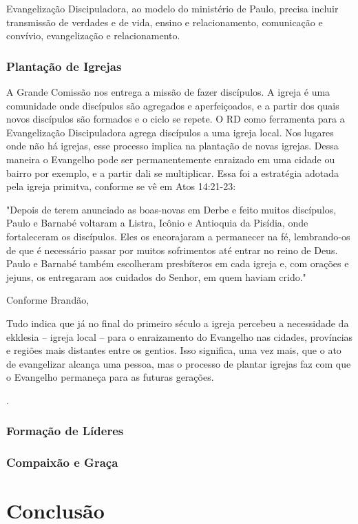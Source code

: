 \documentclass[
	12pt,				%
	openright,			%
	twoside,			%
	a4paper,			%
	english,			%
	french,				%
	spanish,			%
	brazil				%
	]{abntex2}
\begin{document}
Evangelização Discipuladora, ao modelo do ministério de Paulo, precisa incluir transmissão de verdades e de vida, ensino e relacionamento, comunicação e convívio, evangelização e relacionamento.

\subsection{Plantação de Igrejas}

A Grande Comissão nos entrega a missão de fazer discípulos. A igreja é uma comunidade onde discípulos são agregados e aperfeiçoados, e a partir dos quais novos discípulos são formados e o ciclo se repete. O RD como ferramenta para a Evangelização Discipuladora agrega discípulos a uma igreja local. Nos lugares onde não há igrejas, esse processo implica na plantação de novas igrejas. Dessa maneira o Evangelho pode ser permanentemente enraizado em uma cidade ou bairro por exemplo, e a partir dali se multiplicar\cite[99,100]{brandao}. Essa foi a estratégia adotada pela igreja primitva, conforme se vê em Atos 14:21-23: \begin{citacao}"Depois de terem anunciado as boas-novas em Derbe e feito muitos discípulos, Paulo e Barnabé voltaram a Listra, Icônio e Antioquia da Pisídia, onde fortaleceram os discípulos. Eles os encorajaram a permanecer na fé, lembrando-os de que é necessário passar por muitos sofrimentos até entrar no reino de Deus. Paulo e Barnabé também escolheram presbíteros em cada igreja e, com orações e jejuns, os entregaram aos cuidados do Senhor, em quem haviam crido."\end{citacao}
Conforme Brandão, \begin{citacao}Tudo indica que já no final do primeiro século a igreja percebeu a necessidade	da ekklesia – igreja local – para o enraizamento do Evangelho nas cidades,	províncias e regiões mais distantes entre os gentios. Isso significa, uma vez mais,	que o ato de evangelizar alcança uma pessoa, mas o processo de plantar igrejas	faz com que o Evangelho permaneça para as futuras gerações.\end{citacao}\cite[101]{brandao}.	

\subsection{Formação de Líderes}
\subsection{Compaixão e Graça}

\chapter{Conclusão}


\end{document}
